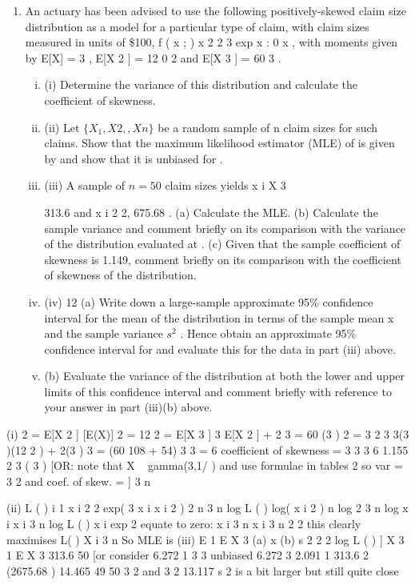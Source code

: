 \documentclass[a4paper,12pt]{article}
\begin{document}
\begin{enumerate}
\item An actuary has been advised to use the following positively-skewed claim size distribution as a model for a particular type of claim, with claim sizes measured in units of \$100,
f ( x ; )
x 2
2
3
exp
x
: 0
x
,
with moments given by E[X] = 3 , E[X 2 ] = 12
0
2
and E[X 3 ] = 60 3 .
\begin{enumerate}[(i)]
\item (i) Determine the variance of this distribution and calculate the coefficient of skewness.
\item  (ii) Let $\{X_1 , X 2 ,, X n\}$ be a random sample of n claim sizes for such claims. Show that the maximum likelihood estimator (MLE) of is given by
and show that it is unbiased for .
\item (iii)
A sample of $n = 50$ claim sizes yields x i
X
3

313.6 and x i 2
2, 675.68 .
(a) Calculate the MLE.
(b) Calculate the sample variance and comment briefly on its comparison with the variance of the distribution evaluated at .
(c) Given that the sample coefficient of skewness is 1.149, comment briefly on its comparison with the coefficient of skewness of the distribution.
%
\item (iv)
12
(a) Write down a large-sample approximate 95\% confidence interval for the mean of the distribution in terms of the sample mean x and the sample variance $s^2$ . Hence obtain an approximate 95\% confidence interval for and evaluate this for the data in part (iii) above.
\item 
(b) Evaluate the variance of the distribution at both the lower and upper limits of this confidence interval and comment briefly with reference to your answer in part (iii)(b) above.
\end{enumerate}
\end{enumerate}
\item (i)
2
= E[X 2 ]
[E(X)] 2 = 12
2
= E[X 3 ] 3 E[X 2 ] + 2
3
= 60
(3 ) 2 = 3
2
3
3(3 )(12 2 ) + 2(3 ) 3
= (60
108 + 54)
3
3
= 6
coefficient of skewness =
3
3
3
6
1.155
2 3
( 3
)
[OR: note that X ~ gamma(3,1/ ) and use formulae in tables
2
so var = 3 2 and coef. of skew. =
]
3
n
\item (ii)
L ( )
i 1
x i 2
2
exp(
3
x i
x i 2
)
2
n 3 n
log L ( ) log( x i 2 ) n log 2 3 n log
x i
x i
3 n
log L ( )
x i
exp
2
equate to zero:
x i
3 n
x i
3 n
2
2
this clearly maximises L( )
X i
3 n
So MLE is
(iii)
E 1
E X
3
(a) x
(b) s 2
2
2
log L ( ) ]
X
3
1
E X
3
313.6
50
[or consider
6.272
1
3
3
unbiased
6.272
3
2.091
1
313.6 2
(2675.68
) 14.465
49
50
3
2
and 3
2
13.117
s 2 is a bit larger but still quite close
\end{document}
